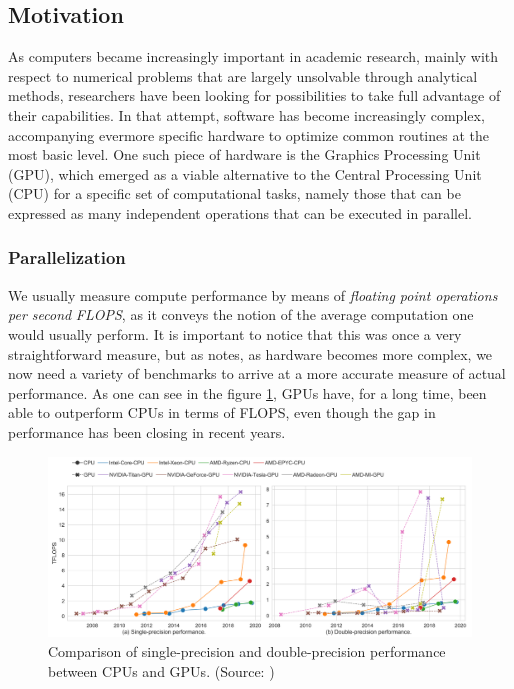 \documentclass[11pt, conference, onecolumn, final]{IEEEtran}
\begin{document}
\subsection{Motivation} \label{sec:intro:motivation}

As computers became increasingly important in academic research, mainly with
respect to numerical problems that are largely unsolvable through analytical
methods, researchers have been looking for possibilities to take full advantage
of their capabilities.
In that attempt, software has become increasingly complex, accompanying
evermore specific hardware to optimize common routines at the most basic level.
One such piece of hardware is the Graphics Processing Unit (GPU), which emerged
as a viable alternative to the Central Processing Unit (CPU) for a specific
set of computational tasks, namely those that can be expressed as many
independent operations that can be executed in parallel.

\subsubsection{Parallelization} \label{sec:motivation:parallelization}

We usually measure compute performance by means of \textit{floating point
operations per second} \textit{FLOPS}, as it conveys the notion of the average
computation one would usually perform.
It is important to notice that this was once a very straightforward measure, but
as \cite{dolbeau2018theoretical} notes, as hardware becomes more complex, we
now need a variety of benchmarks to arrive at a more accurate measure of actual
performance.
As one can see in the figure \ref{fig:cpu-vs-gpu-flops}, GPUs have, for a long
time, been able to outperform CPUs in terms of FLOPS, even though the gap in
performance has been closing in recent years.

\begin{figure}[ht]
    \centering
    \includegraphics[width=0.9\linewidth]{gpu-vs-cpu-flops.png}
    \caption{Comparison of single-precision and double-precision performance
    between CPUs and GPUs. (Source: \cite{sun2019summarizing})}
    \label{fig:cpu-vs-gpu-flops}
\end{figure}
\end{document}
